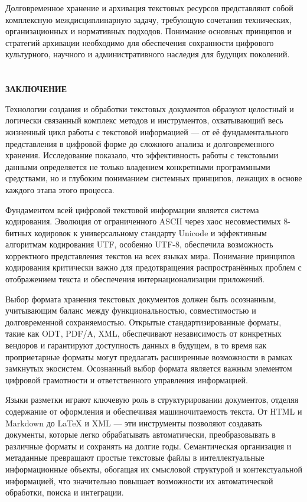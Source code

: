 \documentclass{SibFU-docs}
\begin{document}
Долговременное хранение и архивация текстовых ресурсов представляют собой комплексную междисциплинарную задачу, требующую сочетания технических, организационных и нормативных подходов. Понимание основных принципов и стратегий архивации необходимо для обеспечения сохранности цифрового культурного, научного и административного наследия для будущих поколений.


\newpage
\section*{}
\vspace*{-2.5em}
\begin{center}\textbf{ЗАКЛЮЧЕНИЕ}\end{center}
{}

Технологии создания и обработки текстовых документов образуют целостный и логически связанный комплекс методов и инструментов, охватывающий весь жизненный цикл работы с текстовой информацией — от её фундаментального представления в цифровой форме до сложного анализа и долговременного хранения. Исследование показало, что эффективность работы с текстовыми данными определяется не только владением конкретными программными средствами, но и глубоким пониманием системных принципов, лежащих в основе каждого этапа этого процесса.

Фундаментом всей цифровой текстовой информации является система кодирования. Эволюция от ограниченного ASCII через хаос несовместимых 8-битных кодировок к универсальному стандарту Unicode и эффективным алгоритмам кодирования UTF, особенно UTF-8, обеспечила возможность корректного представления текстов на всех языках мира. Понимание принципов кодирования критически важно для предотвращения распространённых проблем с отображением текста и обеспечения интернационализации приложений.

Выбор формата хранения текстовых документов должен быть осознанным, учитывающим баланс между функциональностью, совместимостью и долговременной сохраняемостью. Открытые стандартизированные форматы, такие как ODT, PDF/A, XML, обеспечивают независимость от конкретных вендоров и гарантируют доступность данных в будущем, в то время как проприетарные форматы могут предлагать расширенные возможности в рамках замкнутых экосистем. Осознанный выбор формата является важным элементом цифровой грамотности и ответственного управления информацией.

Языки разметки играют ключевую роль в структурировании документов, отделяя содержание от оформления и обеспечивая машиночитаемость текста. От HTML и Markdown до LaTeX и XML — эти инструменты позволяют создавать документы, которые легко обрабатывать автоматически, преобразовывать в различные форматы и сохранять на долгие годы. Семантическая организация и метаданные превращают простые текстовые файлы в интеллектуальные информационные объекты, обогащая их смысловой структурой и контекстуальной информацией, что значительно повышает возможности их автоматической обработки, поиска и интеграции.
\end{document}
